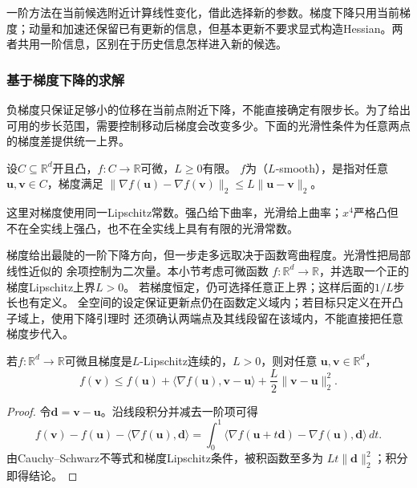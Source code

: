 一阶方法在当前候选附近计算线性变化，借此选择新的参数。梯度下降只用当前梯度；动量和加速还保留已有更新的信息，但基本更新不要求显式构造Hessian。两者共用一阶信息，区别在于历史信息怎样进入新的候选。

\subsubsection{基于梯度下降的求解}
\label{sec:opt-gradient-descent}

负梯度只保证足够小的位移在当前点附近下降，不能直接确定有限步长。为了给出可用的步长范围，需要控制移动后梯度会改变多少。下面的光滑性条件为任意两点的梯度差提供统一上界。
\begin{definition}[欧氏梯度光滑性]
\label{def:opt-smoothness}
设$C\subseteq\mathbb R^d$开且凸，$f:C\to\mathbb R$可微，$L\geq0$有限。
$f$为（$L$-smooth），是指对任意$\bm u,\bm v\in C$，梯度满足
$\lVert\nabla f(\bm{u})-\nabla f(\bm{v})\rVert_2
\leq L\lVert\bm{u}-\bm{v}\rVert_2$。
\end{definition}
这里对梯度使用同一Lipschitz常数。强凸给下曲率，光滑给上曲率；$x^4$严格凸但
不在全实线上强凸，也不在全实线上具有有限的光滑常数。

梯度给出最陡的一阶下降方向，但一步走多远取决于函数弯曲程度。光滑性把局部线性近似的
余项控制为二次量。本小节考虑可微函数
$f:\mathbb R^d\to\mathbb R$，并选取一个正的梯度Lipschitz上界$L>0$。
若梯度恒定，仍可选择任意正上界；这样后面的$1/L$步长也有定义。
全空间的设定保证更新点仍在函数定义域内；若目标只定义在开凸子域上，使用下降引理时
还须确认两端点及其线段留在该域内，不能直接把任意梯度步代入。

\begin{lemma}[下降引理]
\label{lem:opt-descent}
若$f:\mathbb R^d\to\mathbb R$可微且梯度是$L$-Lipschitz连续的，$L>0$，则对任意
$\bm u,\bm v\in\mathbb R^d$，
\begin{equation}
  f(\bm{v})\leq f(\bm{u})
  +\langle\nabla f(\bm{u}),\bm{v}-\bm{u}\rangle
  +\frac{L}{2}\lVert\bm{v}-\bm{u}\rVert_2^2.
  \label{eq:opt-descent-lemma}
\end{equation}
\end{lemma}

\begin{proof}
令$\bm{d}=\bm{v}-\bm{u}$。沿线段积分并减去一阶项可得
\[
  f(\bm{v})-f(\bm{u})-\langle\nabla f(\bm{u}),\bm{d}\rangle
  =
  \int_0^1
  \langle\nabla f(\bm{u}+t\bm{d})-\nabla f(\bm{u}),\bm{d}\rangle\,dt.
\]
由Cauchy--Schwarz不等式和梯度Lipschitz条件，被积函数至多为
$Lt\lVert\bm{d}\rVert_2^2$；积分即得结论。
\end{proof}

